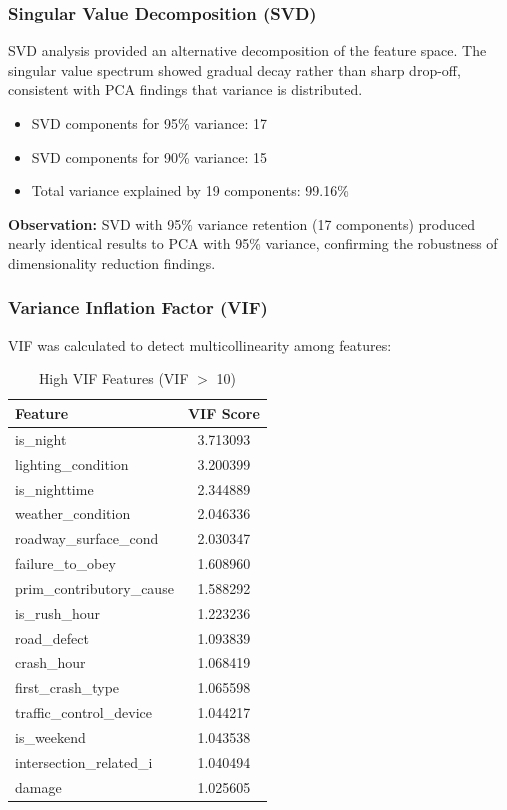 \documentclass[stu,12pt,floatsintext]{apa7}
\begin{document}
\subsubsection{Singular Value Decomposition (SVD)}

SVD analysis provided an alternative decomposition of the feature space. The singular value spectrum showed gradual decay 
rather than sharp drop-off, consistent with PCA findings that variance is distributed.

\begin{itemize}
    \item  SVD components for 95\% variance: 17
    \item  SVD components for 90\% variance: 15
    \item  Total variance explained by 19 components: 99.16\%
\end{itemize}

\textbf{Observation:} SVD with 95\% variance retention (17 components) produced nearly identical results to PCA with 95\% variance, 
confirming the robustness of dimensionality reduction findings.

\subsubsection{Variance Inflation Factor (VIF)}

VIF was calculated to detect multicollinearity among features: 

\begin{table}[H]
\centering
\caption{High VIF Features (VIF $>$ 10)}
\begin{tabular}{lc}
\toprule
\textbf{Feature} & \textbf{VIF Score} \\
\midrule
is\_night & 3.713093 \\
lighting\_condition & 3.200399 \\
is\_nighttime & 2.344889 \\
weather\_condition & 2.046336 \\
roadway\_surface\_cond & 2.030347 \\
failure\_to\_obey & 1.608960 \\
prim\_contributory\_cause & 1.588292 \\
is\_rush\_hour & 1.223236 \\
road\_defect & 1.093839 \\
crash\_hour & 1.068419 \\
first\_crash\_type & 1.065598 \\
traffic\_control\_device & 1.044217 \\
is\_weekend & 1.043538 \\
intersection\_related\_i & 1.040494 \\
damage & 1.025605 \\
\bottomrule
\end{tabular}
\end{table}
\end{document}
